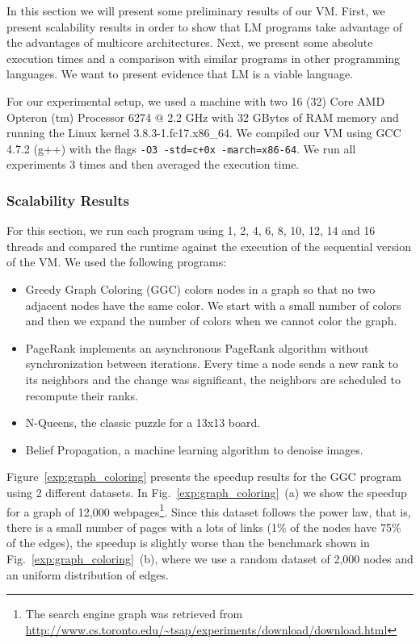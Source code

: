 In this section we will present some preliminary results of our VM.
First, we present scalability results in order to show that LM programs take advantage of the advantages of multicore architectures.
Next, we present some absolute execution times and a comparison with similar programs in other programming languages.
We want to present evidence that LM is a viable language.

For our experimental setup, we used a machine 
with two 16 (32) Core AMD Opteron
(tm) Processor 6274 $@$ 2.2 GHz with 32 GBytes of RAM memory and running the Linux
kernel 3.8.3-1.fc17.x86\_64.
     We compiled our VM using GCC 4.7.2 (g++) with the flags \texttt{-O3 -std=c+0x -march=x86-64}.
     We run all experiments 3 times and then averaged the execution time.
     
\subsubsection{Scalability Results}

For this section, we run each program using 1, 2, 4, 6, 8, 10, 12, 14 and 16 threads and compared the runtime against the execution of the sequential version of the VM. We used the following programs:

\newcommand{\figsize}[0]{6.5cm}
\captionsetup[sub]{              %
       font=scriptsize}

\begin{itemize}
   \item Greedy Graph Coloring (GGC) colors nodes in a graph so that no two adjacent nodes have the same color. We start with a small number of colors and then we expand the number of colors when we cannot color the graph.
   \item PageRank implements an asynchronous PageRank algorithm without synchronization between iterations. Every time a node sends a new rank to its neighbors and the change was significant, the neighbors are scheduled to recompute their ranks.
   \item N-Queens, the classic puzzle for a 13x13 board.
   \item Belief Propagation, a machine learning algorithm to denoise images.
\end{itemize}

Figure~\ref{exp:graph_coloring} presents the speedup results for the GGC program using 2 different datasets. In Fig.~\ref{exp:graph_coloring}~(a) we show the speedup for a graph of 12,000 webpages\footnote{The search engine graph was retrieved from \url{http://www.cs.toronto.edu/~tsap/experiments/download/download.html}}. Since this dataset follows the power law, that is, there is a small number of pages with a lots of links (1\% of the nodes have 75\% of the edges), the speedup is slightly worse than the benchmark shown in Fig.~\ref{exp:graph_coloring}~(b), where we use a random dataset of 2,000 nodes and an uniform distribution of edges.

